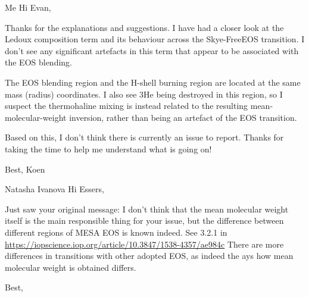 \documentclass[a4paper,10pt]{article}
\begin{document}
\hspace{0.2\textwidth}\begin{minipage}{1.35\textwidth}
	\begin{shadequote}{Me}
		Hi Evan,

		Thanks for the explanations and suggestions.
		I have had a closer look at the Ledoux composition term and its behaviour across the Skye-FreeEOS transition.
		I don't see any significant artefacts in this term that appear to be associated with the EOS blending.

		The EOS blending region and the H-shell burning region are located at the same mass (radius) coordinates.
		I also see 3He being destroyed in this region, so I suspect the thermohaline mixing is instead related to the resulting mean-molecular-weight inversion, rather than being an artefact of the EOS transition.

		Based on this, I don't think there is currently an issue to report.
		Thanks for taking the time to help me understand what is going on!

		Best,
		Koen
	\end{shadequote}
\end{minipage}

\hspace{0.2\textwidth}\begin{minipage}{1.35\textwidth}
	\begin{shadequote}{Natasha Ivanova}
		Hi Essers,

		Just saw your original message: I don't think that the mean molecular
		weight itself is the main responsible thing for your issue, but the
		difference between different regions of MESA EOS is known indeed.
		See 3.2.1 in \url{https://iopscience.iop.org/article/10.3847/1538-4357/ae984c}
		There are more differences in transitions with other adopted EOS, as indeed
		the ays how mean molecular weight is obtained differs.

		Best,
	\end{shadequote}
\end{minipage}
\end{document}
